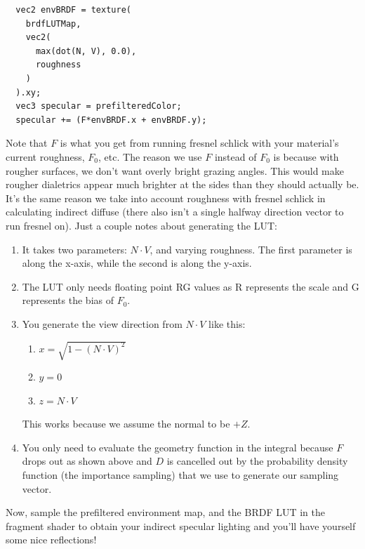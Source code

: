 \documentclass{article}
\begin{document}
\begin{verbatim}
  vec2 envBRDF = texture(
    brdfLUTMap, 
    vec2(
      max(dot(N, V), 0.0), 
      roughness
    )
  ).xy;
  vec3 specular = prefilteredColor;
  specular += (F*envBRDF.x + envBRDF.y);
\end{verbatim}
Note that \(F\) is what you get from running fresnel
schlick with your material's current roughness, \(F_0\), etc. The reason we use \(F\) instead of \(F_0\) is because with rougher surfaces, we don't want overly bright grazing angles. This would make rougher dialetrics appear much brighter at the sides than they should actually be. It's the same reason we take into account roughness with fresnel schlick in calculating indirect diffuse (there also isn't a single halfway direction vector to run fresnel on). Just a couple notes about generating the LUT:
\begin{enumerate}
  \item It takes two parameters: \(N \cdot V\), and varying roughness. The first parameter is along the x-axis, while the second is along the y-axis.
  \item The LUT only needs floating point RG values as R represents the scale and G represents the bias of \(F_0\).
  \item You generate the view direction from \(N \cdot V\) like this: 
    \begin{enumerate}
      \item \(x = \sqrt{1 - (N \cdot V)^2}\)
      \item \(y = 0\)
      \item \(z = N \cdot V\)
    \end{enumerate}
    This works because we assume the normal to be \(+Z\).  
  \item You only need to evaluate the geometry function in the integral because \(F\) drops out as shown above and \(D\) is cancelled out by the probability density function (the importance sampling) that we use to generate our sampling vector.
\end{enumerate}
Now, sample the prefiltered environment map, and the BRDF LUT in the fragment shader to obtain your indirect specular lighting and you'll have yourself some nice
reflections!
\end{document}
